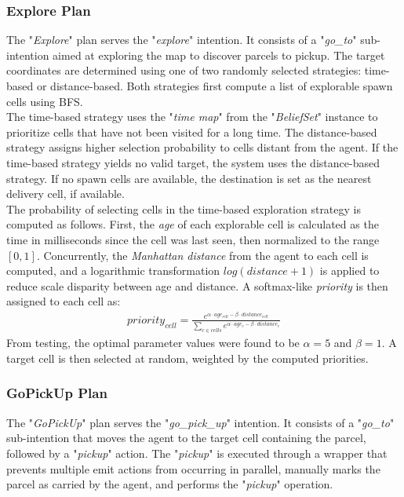         \subsubsection{Explore Plan}
            The "\textit{Explore}" plan serves the "\textit{explore}" intention. It consists of a "\textit{go\_to}" sub-intention aimed at exploring the map to discover parcels to pickup. The target coordinates are determined using one of two randomly selected strategies: time-based or distance-based. Both strategies first compute a list of explorable spawn cells using BFS.
            \medskip\\
            The time-based strategy uses the "\textit{time map}" from the "\textit{BeliefSet}" instance to prioritize cells that have not been visited for a long time. The distance-based strategy assigns higher selection probability to cells distant from the agent. If the time-based strategy yields no valid target, the system uses the distance-based strategy. If no spawn cells are available, the destination is set as the nearest delivery cell, if available.
            \medskip\\
            The probability of selecting cells in the time-based exploration strategy is computed as follows. First, the \textit{age} of each explorable cell is calculated as the time in milliseconds since the cell was last seen, then normalized to the range $[0, 1]$. Concurrently, the \textit{Manhattan distance} from the agent to each cell is computed, and a logarithmic transformation $log(distance + 1)$ is applied to reduce scale disparity between age and distance. A softmax-like \textit{priority} is then assigned to each cell as:
            \begin{gather*}
                priority_{cell} = \frac{e^{\alpha \cdot age_{cell} - \beta \cdot distance_{cell}}}{\sum_{c \in cells}e^{\alpha \cdot age_c - \beta \cdot distance_c}}
            \end{gather*}
            From testing, the optimal parameter values were found to be $\alpha = 5$ and $\beta = 1$. A target cell is then selected at random, weighted by the computed priorities.

        \subsubsection{GoPickUp Plan}
            The "\textit{GoPickUp}" plan serves the "\textit{go\_pick\_up}" intention. It consists of a "\textit{go\_to}" sub-intention that moves the agent to the target cell containing the parcel, followed by a "\textit{pickup}" action. The "\textit{pickup}" is executed through a wrapper that prevents multiple emit actions from occurring in parallel, manually marks the parcel as carried by the agent, and performs the "\textit{pickup}" operation.

